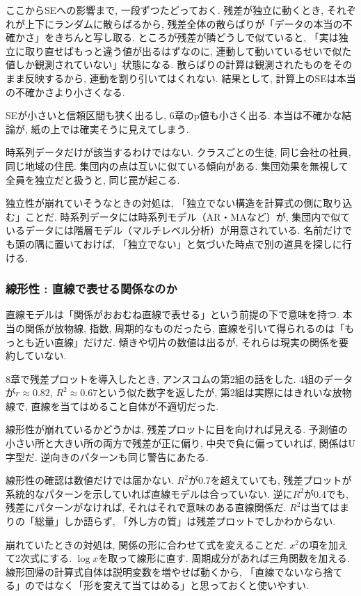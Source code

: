 ここからSEへの影響まで, 一段ずつたどっておく.
残差が独立に動くとき, それぞれが上下にランダムに散らばるから, 残差全体の散らばりが「データの本当の不確かさ」をきちんと写し取る.
ところが残差が隣どうしで似ていると, 「実は独立に取り直せばもっと違う値が出るはずなのに, 連動して動いているせいで似た値しか観測されていない」状態になる.
散らばりの計算は観測されたものをそのまま反映するから, 連動を割り引いてはくれない.
結果として, 計算上のSEは本当の不確かさより小さくなる.

SEが小さいと信頼区間も狭く出るし, 6章のp値も小さく出る.
本当は不確かな結論が, 紙の上では確実そうに見えてしまう.

時系列データだけが該当するわけではない.
クラスごとの生徒, 同じ会社の社員, 同じ地域の住民. 集団内の点は互いに似ている傾向がある.
集団効果を無視して全員を独立だと扱うと, 同じ罠が起こる.

独立性が崩れていそうなときの対処は, 「独立でない構造を計算式の側に取り込む」ことだ.
時系列データには時系列モデル（AR・MAなど）が, 集団内で似ているデータには階層モデル（マルチレベル分析）が用意されている.
名前だけでも頭の隅に置いておけば, 「独立でない」と気づいた時点で別の道具を探しに行ける.

\subsubsection*{線形性 : 直線で表せる関係なのか}

直線モデルは「関係がおおむね直線で表せる」という前提の下で意味を持つ.
本当の関係が放物線, 指数, 周期的なものだったら, 直線を引いて得られるのは「もっとも近い直線」だけだ.
傾きや切片の数値は出るが, それらは現実の関係を要約していない.

8章で残差プロットを導入したとき, アンスコムの第2組の話をした.
4組のデータが$r \approx 0.82$, $R^2 \approx 0.67$という似た数字を返したが, 第2組は実際にはきれいな放物線で, 直線を当てはめること自体が不適切だった.

線形性が崩れているかどうかは, 残差プロットに目を向ければ見える.
予測値の小さい所と大きい所の両方で残差が正に偏り, 中央で負に偏っていれば, 関係はU字型だ.
逆向きのパターンも同じ警告にあたる.

線形性の確認は数値だけでは届かない.
$R^2$が0.7を超えていても, 残差プロットが系統的なパターンを示していれば直線モデルは合っていない.
逆に$R^2$が0.4でも, 残差にパターンがなければ, それはそれで意味のある直線関係だ.
$R^2$は当てはまりの「総量」しか語らず, 「外し方の質」は残差プロットでしかわからない.

崩れていたときの対処は, 関係の形に合わせて式を変えることだ.
$x^2$の項を加えて2次式にする. $\log x$を取って線形に直す. 周期成分があれば三角関数を加える.
線形回帰の計算式自体は説明変数を増やせば動くから, 「直線でないなら捨てる」のではなく「形を変えて当てはめる」と思っておくと使いやすい.

